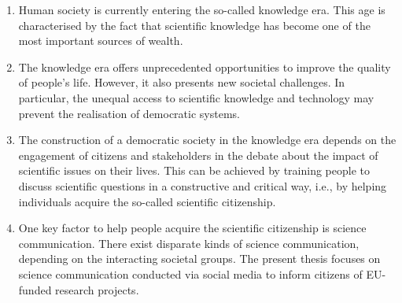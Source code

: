 \begin{enumerate}
 \item Human society is currently entering the so-called knowledge era. This age is characterised by the fact that scientific knowledge has become one of the most important sources of wealth. 
 \item The knowledge era offers unprecedented opportunities to improve the quality of people's life. However, it also presents new societal challenges. In particular, the unequal access to scientific knowledge and technology may prevent the realisation of democratic systems.
 \item The construction of a democratic society in the knowledge era depends on the engagement of citizens and stakeholders in the debate about the impact of scientific issues on their lives. This can be achieved by training people to discuss scientific questions in a constructive and critical way, i.e., by helping individuals acquire the so-called scientific citizenship.
 \item One key factor to help people acquire the scientific citizenship is science communication. There exist disparate kinds of science communication, depending on the interacting societal groups. The present thesis focuses on science communication conducted via social media to inform citizens of EU-funded research projects.     
\end{enumerate}